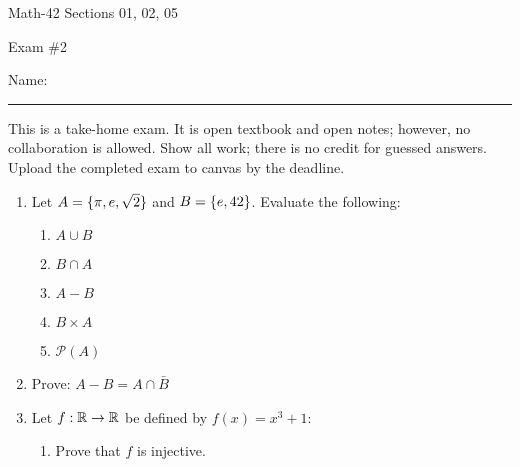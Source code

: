 \documentclass[letterpaper,12pt,fleqn]{article}
\renewcommand{\P}{\mathcal{P}}
\begin{document}
\begin{center}
  \large
  Math-42 Sections 01, 02, 05

  \Large
  Exam \#2
\end{center}

\vspace{0.5in}

Name: \rule{4in}{1pt}

\vspace{0.5in}

This is a take-home exam.  It is open textbook and open notes; however, no collaboration is allowed.  Show all work;
there is no credit for guessed answers.  Upload the completed exam to canvas by the deadline.

\vspace{0.5in}

\begin{enumerate}[left=0pt]

\item Let \(A=\{\pi,e,\sqrt{2}\}\) and \(B=\{e,42\}\).  Evaluate the following:
  \begin{enumerate}
  \item \(A\cup B\)

    \vspace{0.5in}

  \item \(B\cap A\)

    \vspace{0.5in}

  \item \(A-B\)

    \vspace{0.5in}

  \item \(B\times A\)

    \vspace{1in}

  \item \(\P(A)\)
  \end{enumerate}

  \newpage

\item Prove: \(A-B=A\cap\bar{B}\)

  \newpage

\item Let \(f:\mathbb{R}\to\mathbb{R}\) be defined by \(f(x)=x^3+1\):
  \begin{enumerate}
  \item Prove that \(f\) is injective.

    \vspace{2in}


\end{enumerate}
\end{enumerate}
\end{document}

